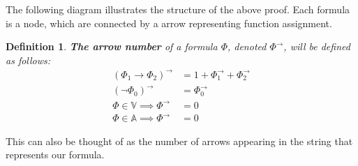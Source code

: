 \documentclass{article}
\newtheorem{defin}{Definition}
\begin{document}
The following diagram illustrates the structure of the above proof.
Each formula is a node, which are connected by a arrow representing function assignment.

\begin{center}
\end{center}

\begin{defin}
\textbf{The arrow number} of a formula $\Phi$, denoted $\Phi^\rightarrow$, will be defined as follows:
\begin{align*}
(\Phi_1\rightarrow\Phi_2)^\rightarrow &= 1 + \Phi_1^\rightarrow + \Phi_2^\rightarrow \\
(\neg\Phi_0)^\rightarrow &= \Phi_0^\rightarrow \\
\Phi \in \mathbb{V} \implies \Phi^\rightarrow &= 0\\
\Phi \in \mathbb{A} \implies \Phi^\rightarrow &= 0
\end{align*}
\end{defin}

This can also be thought of as the number of arrows appearing in the string that represents our formula.
\end{document}
